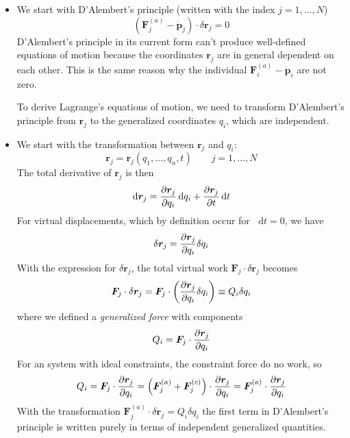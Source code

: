 \documentclass[11pt, a4paper]{article}
\newcommand{\diff}{\mathop{}\!\mathrm{d}} %
\newcommand{\bdot}[1]{\dot{\bm{#1}}}
\begin{document}
\begin{itemize}
	\item We start with D'Alembert's principle (written with the index $ j = 1, \ldots, N$)
	\begin{equation*}
		\left( \bm{F}_{j}^{(a)} - \bdot{p}_{j}\right) \cdot \delta \bm{r}_{j}= 0
	\end{equation*}
	D'Alembert's principle in its current form can't produce well-defined equations of motion because the coordinates $ \bm{r}_{j} $ are in general dependent on each other. This is the same reason why the individual $ \bm{F}_{i}^{(a)} - \bdot{p}_{i} $ are not zero. 
	
	To derive Lagrange's equations of motion, we need to transform D'Alembert's principle from $ \bm{r}_{j} $ to the generalized coordinates $ q_{i} $, which are independent.
	
	\item We start with the transformation between $ \bm{r}_{j} $ and $ q_{i} $:
	\begin{equation*}
		\bm{r}_{j} = \bm{r}_{j}(q_{1}, \ldots, q_{n}, t) \qquad j = 1, \ldots, N
	\end{equation*}
	The total derivative of $ \bm{r}_{j} $ is then
	\begin{equation*}
		\diff \bm{r}_{j} = \pdv{\bm{r}_{j}}{q_{i}}\diff q_{i} + \pdv{\bm{r}_{j}}{t}\diff t
	\end{equation*}
	For virtual displacements, which by definition occur for $ \diff t= 0 $, we have
	\begin{equation*}
		\delta \bm{r}_{j} = \pdv{\bm{r}_{j}}{q_{i}}\delta q_{i}
	\end{equation*}
	With the expression for $ \delta \bm{r}_{j} $, the total virtual work $ \bm{F}_{j} \cdot \delta \bm{r}_{j}$ becomes
	\begin{equation*}
		\bm{F}_{j} \cdot \delta \bm{r}_{j} = \bm{F}_{j} \cdot \left(\pdv{\bm{r}_{j}}{q_{i}}\delta q_{i}\right) \equiv Q_{i} \delta q_{i}
	\end{equation*}
	where we defined a \textit{generalized force} with components
	\begin{equation*}
		Q_{i} = \bm{F}_{j} \cdot \pdv{\bm{r}_{j}}{q_{i}}
	\end{equation*}
	For an system with ideal constraints, the constraint force do no work, so
	\begin{equation*}
		Q_{i} = \bm{F}_{j} \cdot \pdv{\bm{r}_{j}}{q_{i}} = \left(\bm{F}^{(a)}_{j} + \bm{F}^{(c)}_{j}\right) \cdot \pdv{\bm{r}_{j}}{q_{i}} = \bm{F}_{j}^{(a)} \cdot \pdv{\bm{r}_{j}}{q_{i}} 
	\end{equation*}
	With the transformation $ \bm{F}_{j}^{(a)} \cdot \delta \bm{r}_{j} = Q_{i} \delta q_{i} $ the first term in D'Alembert's principle is written purely in terms of independent generalized quantities.
	

\end{itemize}
\end{document}
